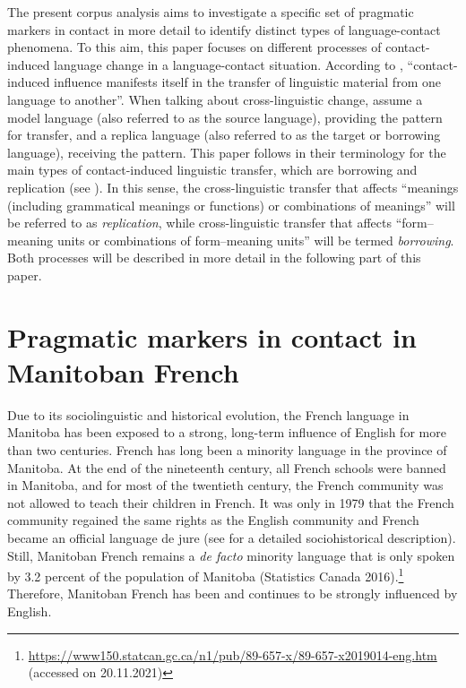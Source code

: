 \documentclass[output=paper]{langscibook}
\begin{document}
The present corpus analysis aims to investigate a specific set of pragmatic markers in contact in more detail to identify distinct types of language-contact phenomena. To this aim, this paper focuses on different processes of contact-induced language change in a language-contact situation. According to \citet[2]{Heine.2005}, “contact-induced influence manifests itself in the transfer of linguistic material from one language to another”. When talking about cross-linguistic change, \citeauthor{Heine.2005} assume a model language (also referred to as the source language), providing the pattern for transfer, and a replica language (also referred to as the target or borrowing language), receiving the pattern. This paper follows \citet{Heine.2010} in their terminology for the main types of contact-induced linguistic transfer, which are borrowing and replication (see \citealt[87]{Heine.2010}). In this sense, the cross-linguistic transfer that affects “meanings (including grammatical meanings or functions) or combinations of meanings” \citep[2]{Heine.2005} will be referred to as \textit{replication}, while cross-linguistic transfer that affects “form–meaning units or combinations of form–meaning units” \citep[2]{Heine.2005} will be termed \textit{borrowing}. Both processes will be described in more detail in the following part of this paper.

\section{Pragmatic markers in contact in Manitoban French}\label{hennecke:sec:3}
Due to its sociolinguistic and historical evolution, the French language in Manitoba has been exposed to a strong, long-term influence of English for more than two centuries. French has long been a minority language in the province of Manitoba. At the end of the nineteenth century, all French schools were banned in Manitoba, and for most of the twentieth century, the French community was not allowed to teach their children in French. It was only in 1979 that the French community regained the same rights as the English community and French became an official language de jure (see \citealt{Hennecke.2014} for a detailed sociohistorical description). Still, Manitoban French remains a \textit{de facto} minority language that is only spoken by 3.2 percent of the population of Manitoba (Statistics Canada 2016).\footnote{\url{https://www150.statcan.gc.ca/n1/pub/89-657-x/89-657-x2019014-eng.htm} (accessed on 20.11.2021)}  
Therefore, Manitoban French has been and continues to be strongly influenced by English.
\end{document}
